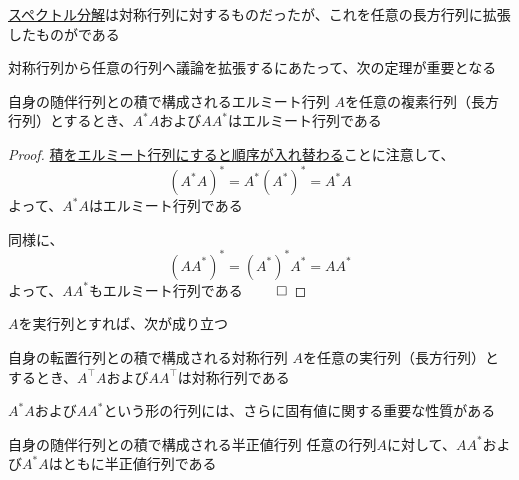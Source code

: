 \documentclass[../../../topic_linear-algebra]{subfiles}
\begin{document}
\hyperref[thm:spectral-decomposition-symmetric]{スペクトル分解}は対称行列に対するものだったが、これを任意の長方行列に拡張したものがである

\br

対称行列から任意の行列へ議論を拡張するにあたって、次の定理が重要となる

\begin{theorem}{自身の随伴行列との積で構成されるエルミート行列}
  $A$を任意の複素行列（長方行列）とするとき、$A^* A$および$AA^*$はエルミート行列である
\end{theorem}

\begin{proof}
  \hyperref[thm:adjoint-of-product]{積をエルミート行列にすると順序が入れ替わる}ことに注意して、
  \begin{equation*}
    (A^* A)^* = A^* (A^*)^* = A^* A
  \end{equation*}
  よって、$A^* A$はエルミート行列である

  \br

  同様に、
  \begin{equation*}
    (AA^*)^* = (A^*)^* A^* = AA^*
  \end{equation*}
  よって、$AA^*$もエルミート行列である $\qed$
\end{proof}

\br

$A$を実行列とすれば、次が成り立つ

\begin{theorem}{自身の転置行列との積で構成される対称行列}\label{thm:symmetric-products-of-any-matrix}
  $A$を任意の実行列（長方行列）とするとき、$A^\top A$および$AA^\top$は対称行列である
\end{theorem}

\sectionline

$A^* A$および$AA^*$という形の行列には、さらに固有値に関する重要な性質がある

\begin{theorem}{自身の随伴行列との積で構成される半正値行列}
  任意の行列$A$に対して、$AA^*$および$A^*A$はともに半正値行列である
\end{theorem}
\end{document}
